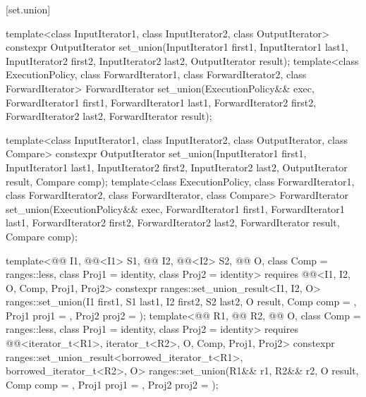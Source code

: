 [set.union]{}

%
\begin{itemdecl}
template<class InputIterator1, class InputIterator2,
         class OutputIterator>
  constexpr OutputIterator
    set_union(InputIterator1 first1, InputIterator1 last1,
              InputIterator2 first2, InputIterator2 last2,
              OutputIterator result);
template<class ExecutionPolicy, class ForwardIterator1, class ForwardIterator2,
         class ForwardIterator>
  ForwardIterator
    set_union(ExecutionPolicy&& exec,
              ForwardIterator1 first1, ForwardIterator1 last1,
              ForwardIterator2 first2, ForwardIterator2 last2,
              ForwardIterator result);

template<class InputIterator1, class InputIterator2,
         class OutputIterator, class Compare>
  constexpr OutputIterator
    set_union(InputIterator1 first1, InputIterator1 last1,
              InputIterator2 first2, InputIterator2 last2,
              OutputIterator result, Compare comp);
template<class ExecutionPolicy, class ForwardIterator1, class ForwardIterator2,
         class ForwardIterator, class Compare>
  ForwardIterator
    set_union(ExecutionPolicy&& exec,
              ForwardIterator1 first1, ForwardIterator1 last1,
              ForwardIterator2 first2, ForwardIterator2 last2,
              ForwardIterator result, Compare comp);

template<@@ I1, @@<I1> S1, @@ I2, @@<I2> S2,
         @@ O, class Comp = ranges::less,
         class Proj1 = identity, class Proj2 = identity>
  requires @@<I1, I2, O, Comp, Proj1, Proj2>
  constexpr ranges::set_union_result<I1, I2, O>
    ranges::set_union(I1 first1, S1 last1, I2 first2, S2 last2, O result, Comp comp = {},
                      Proj1 proj1 = {}, Proj2 proj2 = {});
template<@@ R1, @@ R2, @@ O,
         class Comp = ranges::less, class Proj1 = identity, class Proj2 = identity>
  requires @@<iterator_t<R1>, iterator_t<R2>, O, Comp, Proj1, Proj2>
  constexpr ranges::set_union_result<borrowed_iterator_t<R1>, borrowed_iterator_t<R2>, O>
    ranges::set_union(R1&& r1, R2&& r2, O result, Comp comp = {},
                      Proj1 proj1 = {}, Proj2 proj2 = {});
\end{itemdecl}

